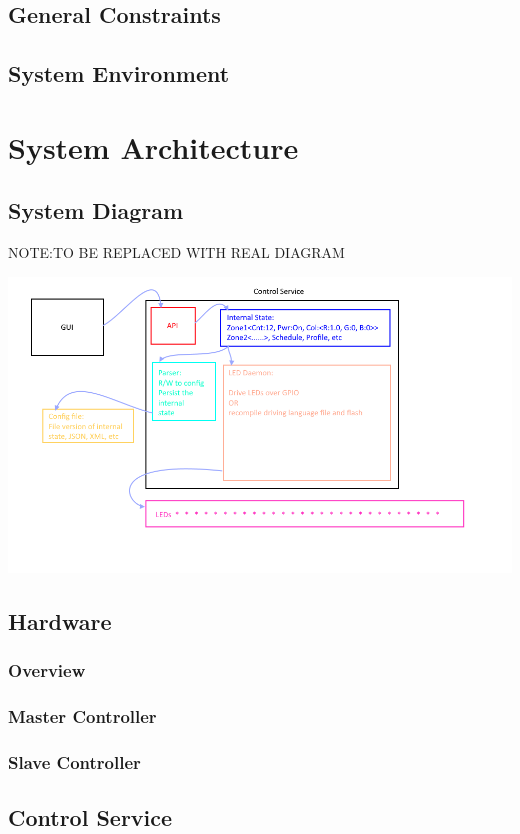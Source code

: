 \documentclass[onecolumn, draftclsnofoot,10pt, compsoc]{IEEEtran}
\begin{document}
		\subsection{General Constraints}
		\subsection{System Environment}


	\section{System Architecture}
		\subsection{System Diagram}
		NOTE:TO BE REPLACED WITH REAL DIAGRAM

		\includegraphics[width=\linewidth]{sysdiag.png}

		\subsection{Hardware}
			\subsubsection{Overview}
			\subsubsection{Master Controller}
			\subsubsection{Slave Controller}


		\subsection{Control Service}
\end{document}
